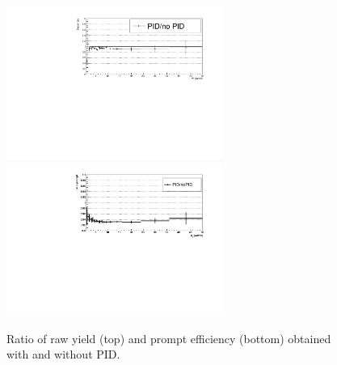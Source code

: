 \begin{figure}[!b]
\begin{center}
\includegraphics[width=0.63\textwidth]{figures/Dstar/pp13TeV/rawyield_ratio_PID_noPID-new.pdf}
 \includegraphics[width=0.63\textwidth]{figures/Dstar/pp13TeV/prompt_PID_noPID_ratio-v3.pdf}
 \caption{Ratio of raw yield (top) and prompt efficiency (bottom) obtained with and without PID.}
\label{fig:PIDsyst}
\end{center}
\end{figure}

